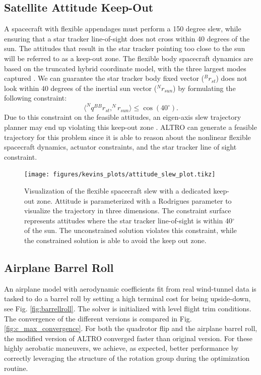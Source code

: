 \documentclass[letterpaper, 10 pt, conference]{ieeeconf}  %
\begin{document}
    \subsection{Satellite Attitude Keep-Out}
    A spacecraft with flexible appendages must perform a 150 degree slew, while ensuring
    that a star tracker line-of-sight does not cross within 40 degrees of the sun. The
    attitudes that result in the star tracker pointing too close to the sun will be
    referred to as a keep-out zone. The flexible body spacecraft dynamics are based on
    the truncated hybrid coordinate model, with the three largest modes captured
    \cite{Tracy2020}. We can guarantee the star tracker body fixed vector ($^Br_{st}$)
    does not look within 40 degrees of the inertial sun vector ($^Nr_{sun}$) by
    formulating the following constraint:
    \begin{equation}
        \langle ^N q ^B {}^Br_{st} , ^Nr_{sun}\rangle \leq \cos(40 ^\circ).
    \end{equation}
    Due to this constraint on the feasible attitudes, an eigen-axis slew trajectory
    planner may end up violating this keep-out zone \cite{markley2014fundamentals}. ALTRO
    can generate a feasible trajectory for this problem since it is able to reason about
    the nonlinear flexible spacecraft dynamics, actuator constraints, and the star
    tracker line of sight constraint.
        \begin{figure}
            \centering
            \texttt{[image: figures/kevins\_plots/attitude\_slew\_plot.tikz]}
            \caption{Visualization of the flexible spacecraft slew with a dedicated keep-out zone. Attitude is parameterized with a Rodrigues parameter to visualize the trajectory in three dimensions. The constraint surface represents attitudes where the star tracker line-of-sight is within 40$^\circ$ of the sun. The unconstrained solution violates this constraint, while the constrained solution is able to avoid the keep out zone.}
        \end{figure}


    \subsection{Airplane Barrel Roll}

        An airplane model with aerodynamic coefficients fit from real wind-tunnel data is
        tasked to do a barrel roll by setting a high terminal cost for being upside-down,
        see Fig. \ref{fig:barrellroll}. The solver is initialized with level flight trim
        conditions. The convergence of the different versions is compared in Fig.
        \ref{fig:c_max_convergence}. For both the quadrotor flip and the airplane barrel
        roll, the modified version of ALTRO converged faster than original version.
        For these highly aerobatic maneuvers, we achieve, as expected, better
        performance by correctly leveraging the structure of the rotation group during
        the optimization routine.
\end{document}
